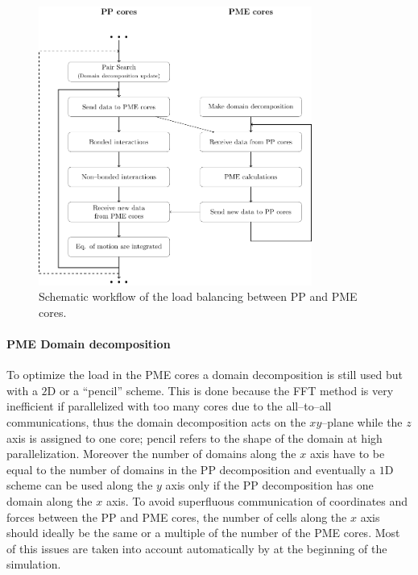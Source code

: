 \begin{figure}[h!t]
	\centering
	\includegraphics[width=0.8\textwidth]{./img/Schemi/PPPMECores}
	\caption{Schematic workflow of the load balancing between \acs{PP} and \acs{PME} cores.}
	\label{fig:PPPMECores}
\end{figure}

\paragraph{\textbf{PME Domain decomposition}} To optimize the load in the \ac{PME} cores a domain decomposition 
is still used but with a $2$D or a ``pencil'' scheme. This is done because the \ac{FFT} method is very inefficient 
if parallelized with too many cores due to the all--to--all communications, thus the domain decomposition acts on 
the $xy$--plane while the $z$ axis is assigned to one core; pencil refers to the shape of the domain at high 
parallelization. Moreover the number of domains along the $x$ axis have to be equal to the number of domains in 
the \ac{PP} decomposition and eventually a $1$D scheme can be used along the $y$ axis only if the \ac{PP} 
decomposition has one domain along the $x$ axis. To avoid superfluous communication of coordinates and forces 
between the \ac{PP} and \ac{PME} cores, the number of cells along the $x$ axis should ideally be the same or a 
multiple of the number of the \ac{PME} cores. Most of this issues are taken into account automatically by 
\gromacs{} at the beginning of the simulation.


